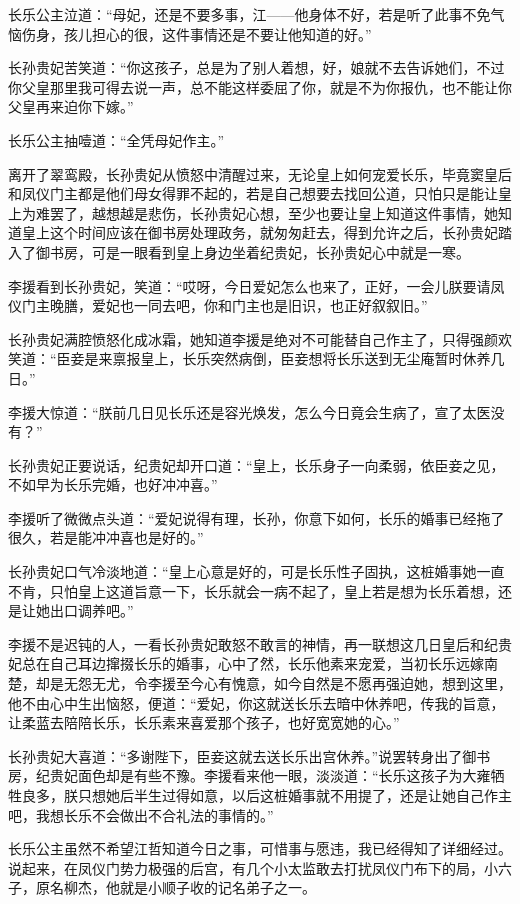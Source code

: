 长乐公主泣道：“母妃，还是不要多事，江——他身体不好，若是听了此事不免气恼伤身，孩儿担心的很，这件事情还是不要让他知道的好。”

长孙贵妃苦笑道：“你这孩子，总是为了别人着想，好，娘就不去告诉她们，不过你父皇那里我可得去说一声，总不能这样委屈了你，就是不为你报仇，也不能让你父皇再来迫你下嫁。”

长乐公主抽噎道：“全凭母妃作主。”

离开了翠鸾殿，长孙贵妃从愤怒中清醒过来，无论皇上如何宠爱长乐，毕竟窦皇后和凤仪门主都是他们母女得罪不起的，若是自己想要去找回公道，只怕只是能让皇上为难罢了，越想越是悲伤，长孙贵妃心想，至少也要让皇上知道这件事情，她知道皇上这个时间应该在御书房处理政务，就匆匆赶去，得到允许之后，长孙贵妃踏入了御书房，可是一眼看到皇上身边坐着纪贵妃，长孙贵妃心中就是一寒。

李援看到长孙贵妃，笑道：“哎呀，今日爱妃怎么也来了，正好，一会儿朕要请凤仪门主晚膳，爱妃也一同去吧，你和门主也是旧识，也正好叙叙旧。”

长孙贵妃满腔愤怒化成冰霜，她知道李援是绝对不可能替自己作主了，只得强颜欢笑道：“臣妾是来禀报皇上，长乐突然病倒，臣妾想将长乐送到无尘庵暂时休养几日。”

李援大惊道：“朕前几日见长乐还是容光焕发，怎么今日竟会生病了，宣了太医没有？”

长孙贵妃正要说话，纪贵妃却开口道：“皇上，长乐身子一向柔弱，依臣妾之见，不如早为长乐完婚，也好冲冲喜。”

李援听了微微点头道：“爱妃说得有理，长孙，你意下如何，长乐的婚事已经拖了很久，若是能冲冲喜也是好的。”

长孙贵妃口气冷淡地道：“皇上心意是好的，可是长乐性子固执，这桩婚事她一直不肯，只怕皇上这道旨意一下，长乐就会一病不起了，皇上若是想为长乐着想，还是让她出口调养吧。”

李援不是迟钝的人，一看长孙贵妃敢怒不敢言的神情，再一联想这几日皇后和纪贵妃总在自己耳边撺掇长乐的婚事，心中了然，长乐他素来宠爱，当初长乐远嫁南楚，却是无怨无尤，令李援至今心有愧意，如今自然是不愿再强迫她，想到这里，他不由心中生出恼怒，便道：“爱妃，你这就送长乐去暗中休养吧，传我的旨意，让柔蓝去陪陪长乐，长乐素来喜爱那个孩子，也好宽宽她的心。”

长孙贵妃大喜道：“多谢陛下，臣妾这就去送长乐出宫休养。”说罢转身出了御书房，纪贵妃面色却是有些不豫。李援看来他一眼，淡淡道：“长乐这孩子为大雍牺牲良多，朕只想她后半生过得如意，以后这桩婚事就不用提了，还是让她自己作主吧，我想长乐不会做出不合礼法的事情的。”

长乐公主虽然不希望江哲知道今日之事，可惜事与愿违，我已经得知了详细经过。说起来，在凤仪门势力极强的后宫，有几个小太监敢去打扰凤仪门布下的局，小六子，原名柳杰，他就是小顺子收的记名弟子之一。

